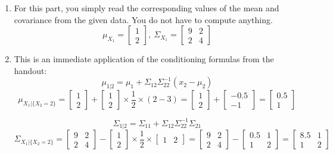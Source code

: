 \documentclass[letterpaper]{article}
\begin{document}
\begin{enumerate}
    \setlength{\itemsep}{.15in}
    \renewcommand{\labelenumi}{(\alph{enumi})}
    \setlength{\itemsep}{.1in}
  \item For this part, you simply read the corresponding values of the mean and covariance from the given data. You do not have to compute anything.
  $$ \mu_{X_1}= \begin{bmatrix} 1 \\2 \end{bmatrix},~ \Sigma_{X_1}= \begin{bmatrix} 9 &2  \\2 & 4 \end{bmatrix} $$

  \item This is an immediate application of the conditioning formulas from the handout:
  $$\mu_{1|2} = \mu_1 + \Sigma_{12}\Sigma^{-1}_{22} (x_2 - \mu_2 ) $$
  $$\mu_{X_1|\{X_2=2\}} = \begin{bmatrix} 1 \\2  \end{bmatrix} + \begin{bmatrix} 1 \\2  \end{bmatrix}\times \frac{1}{2} \times (2 - 3 ) = \begin{bmatrix} 1 \\2  \end{bmatrix} + \begin{bmatrix} -0.5 \\ -1  \end{bmatrix} = \begin{bmatrix} 0.5 \\1  \end{bmatrix}$$

  $$\Sigma_{1|2} = \Sigma_{11} + \Sigma_{12}\Sigma^{-1}_{22}\Sigma_{21} $$
  $$\Sigma_{X_1|\{X_2=2\}} = \begin{bmatrix} 9 & 2 \\ 2 & 4  \end{bmatrix} -  \begin{bmatrix} 1 \\2  \end{bmatrix} \times \dfrac{1}{2} \times \begin{bmatrix} 1 & 2  \end{bmatrix} = \begin{bmatrix} 9 & 2 \\ 2 & 4  \end{bmatrix} - \begin{bmatrix} 0.5 & 1 \\ 1 & 2  \end{bmatrix} = \begin{bmatrix} 8.5 & 1 \\ 1 & 2  \end{bmatrix}$$


\end{enumerate}
\end{document}
